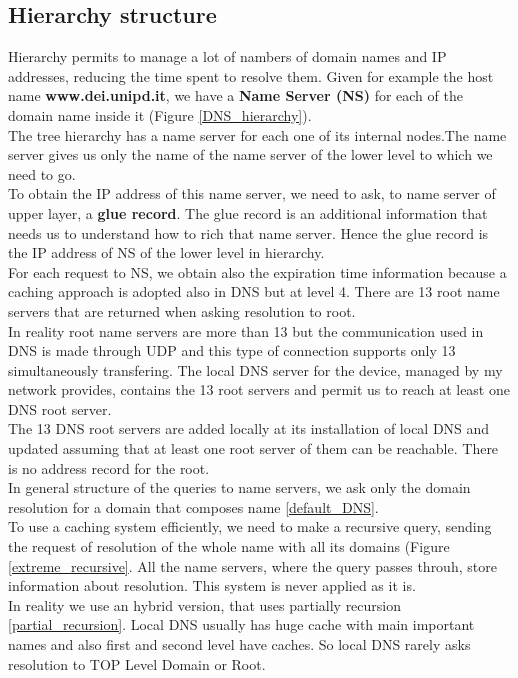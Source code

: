 \subsection{Hierarchy structure}
Hierarchy permits to manage a lot of nambers of domain names and IP addresses, reducing the time spent to resolve them. Given for example the host name \textbf{www.dei.unipd.it}, we have a \textbf{Name Server (NS)} for each of the domain name inside it (Figure \ref{DNS_hierarchy}).\\
The tree hierarchy has a name server for each one of its internal nodes.The name server gives us only the name of the name server of the lower level to which we need to go.\\
To obtain the IP address of this name server, we need to ask, to name server of upper layer, a \textbf{glue record}. The glue record is an additional information that needs us to understand how to rich that name server. Hence the glue record is the IP address of NS of the lower level in hierarchy. \\
For each request to NS, we obtain also the expiration time information because a caching approach is adopted also in DNS but at level 4. There are 13 root name servers that are returned when asking resolution to root. \\
In reality root name servers are more than 13 but the communication used in DNS is made through UDP and this type of connection supports only 13 simultaneously transfering. The local DNS server for the device, managed by my network provides, contains the 13 root servers and permit us to reach at least one DNS root server.\\
The 13 DNS root servers are added locally at its installation of local DNS and updated assuming that at least one root server of them can be reachable. There is no address record for the root.\\
In general structure of the queries to name servers, we ask only the domain resolution for a domain that composes name \ref{default_DNS}.\\
To use a caching system efficiently, we need to make a recursive query, sending the request of resolution of the whole name with all its domains (Figure \ref{extreme_recursive}. All the name servers, where the query passes throuh, store information about resolution. This system is never applied as it is.\\
In reality we use an hybrid version, that uses partially recursion \ref{partial_recursion}. Local DNS  usually has huge cache with main important names and also first and second level have caches. So local DNS rarely asks resolution to TOP Level Domain or Root.\\
